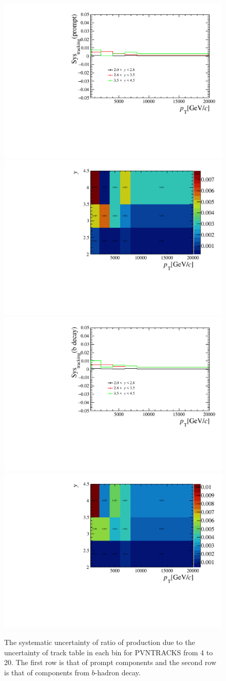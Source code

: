 \begin{figure}[!tbp]
    \begin{center}
      \includegraphics[width=0.49\linewidth]{pdf/SysTracking/n1Errp_point.pdf}
      \includegraphics[width=0.49\linewidth]{pdf/SysTracking/n1Errp.pdf}
      \vspace*{-0.5cm}
      \includegraphics[width=0.49\linewidth]{pdf/SysTracking/n1Errb_point.pdf}
      \includegraphics[width=0.49\linewidth]{pdf/SysTracking/n1Errb.pdf}
    \end{center}
    \caption{The systematic uncertainty of ratio of production due to the uncertainty of track table in each bin for PVNTRACKS from 4 to 20. The first row is that of prompt components and the second row is that of components from $b$-hadron decay.
      }
    \label{Sys_Tracking1}
\end{figure}

